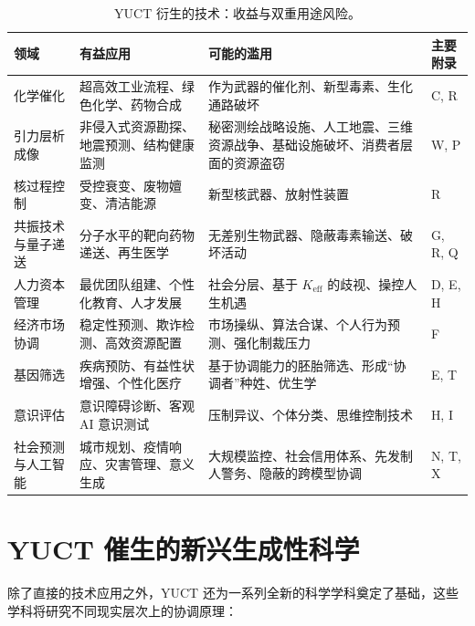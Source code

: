 \documentclass[12pt,a4paper]{article}
\theoremstyle{remark}
\newcommand{\Keff}{K_{\mathrm{eff}}}
\begin{document}
	\begin{table}[htbp]
		\centering
		\caption{YUCT 衍生的技术：收益与双重用途风险。}
		\label{tab:tech-summary}
		\small
		\begin{tabularx}{\textwidth}{p{2.8cm}Xp{3.5cm}p{2.5cm}}
			\toprule
			\textbf{领域} & \textbf{有益应用} & \textbf{可能的滥用} & \textbf{主要附录} \\
			\midrule
			化学催化 & 超高效工业流程、绿色化学、药物合成 & 作为武器的催化剂、新型毒素、生化通路破坏 & C, R \\
			引力层析成像 & 非侵入式资源勘探、地震预测、结构健康监测 & 秘密测绘战略设施、人工地震、三维资源战争、基础设施破坏、消费者层面的资源盗窃 & W, P \\
			核过程控制 & 受控衰变、废物嬗变、清洁能源 & 新型核武器、放射性装置 & R \\
			共振技术与量子递送 & 分子水平的靶向药物递送、再生医学 & 无差别生物武器、隐蔽毒素输送、破坏活动 & G, R, Q \\
			人力资本管理 & 最优团队组建、个性化教育、人才发展 & 社会分层、基于 \(\Keff\) 的歧视、操控人生机遇 & D, E, H \\
			经济市场协调 & 稳定性预测、欺诈检测、高效资源配置 & 市场操纵、算法合谋、个人行为预测、强化制裁压力 & F \\
			基因筛选 & 疾病预防、有益性状增强、个性化医疗 & 基于协调能力的胚胎筛选、形成“协调者”种姓、优生学 & E, T \\
			意识评估 & 意识障碍诊断、客观 AI 意识测试 & 压制异议、个体分类、思维控制技术 & H, I \\
			社会预测与人工智能 & 城市规划、疫情响应、灾害管理、意义生成 & 大规模监控、社会信用体系、先发制人警务、隐蔽的跨模型协调 & N, T, X \\
			\bottomrule
		\end{tabularx}
	\end{table}
	
	\section{YUCT 催生的新兴生成性科学}
	\label{sec:generative}
	
	除了直接的技术应用之外，YUCT 还为一系列全新的科学学科奠定了基础，这些学科将研究不同现实层次上的协调原理：
	
\end{document}
